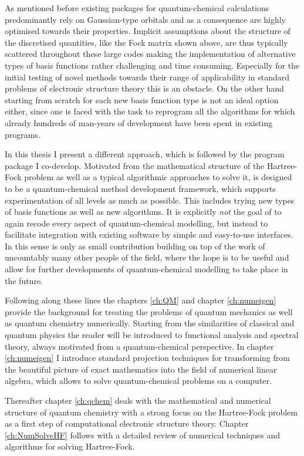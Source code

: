 As mentioned before existing packages for quantum-chemical calculations
predominantly rely on Gaussian-type orbitals
and as a consequence are highly optimised towards their properties.
Implicit assumptions
about the structure of the discretised quantities,
like the Fock matrix shown above,
are thus typically scattered throughout these large codes
making the implementation of alternative types of basis functions
rather challenging and time consuming.
Especially for the initial testing of novel methods
towards their range of applicability
in standard problems of electronic structure theory
this is an obstacle.
On the other hand starting from scratch for each new basis function type
is not an ideal option either,
since one is faced with the task to reprogram all the algorithms for which
already hundreds of man-years of development have been spent in existing programs.

In this thesis I present a different approach,
which is followed by the \molsturm program package I co-develop.
Motivated from the mathematical structure of the Hartree-Fock problem
as well as a typical algorithmic approaches to solve it,
\molsturm is designed to be a quantum-chemical method development framework,
which supports experimentation of all levels as much as possible.
This includes trying new types of basis functions as well as new algorithms.
It is explicitly \emph{not} the goal of \molsturm to again recode
every aspect of quantum-chemical modelling,
but instead to facilitate integration with existing software
by simple and easy-to-use interfaces.
In this sense \molsturm is only as small contribution building on top
of the work of uncountably many other people of the field,
where the hope is to be useful and allow for
further developments of quantum-chemical modelling to take place in the future.

Following along these lines the chapters
\ref{ch:QM} and chapter \ref{ch:numeigen}
provide the background for treating the problems of quantum mechanics
as well as quantum chemistry numerically.
Starting from the similarities of classical and quantum physics
the reader will be introduced to functional analysis
and spectral theory, always motivated from a quantum-chemical perspective.
In chapter \ref{ch:numeigen} I introduce standard projection techniques
for transforming from the beautiful picture of exact mathematics
into the field of numerical linear algebra,
which allows to solve quantum-chemical problems on a computer.

Thereafter chapter \ref{ch:qchem}
deals with the mathematical and numerical structure of quantum chemistry
with a strong focus on the Hartree-Fock problem
as a first step of computational electronic structure theory.
Chapter \ref{ch:NumSolveHF}
follows with a detailed review of numerical techniques and algorithms
for solving Hartree-Fock.


